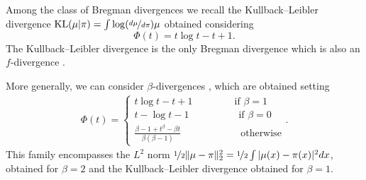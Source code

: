 \documentclass{article}
\newcommand{\KL}{\mathop{\mathrm{KL}}\nolimits}
\newcommand{\R}{\mathbb R}
\begin{document}
Among the class of Bregman divergences we recall the Kullback--Leibler divergence 
$\KL(\mu|\pi) =\int \log(\nicefrac{d\mu}{d\pi}) \mu$ obtained considering %
\begin{equation*}
    \Phi(t)= t \log t  -t +1.
\end{equation*}
The Kullback--Leibler divergence is the only Bregman divergence which is also an $f$-divergence \citep{amari2009alpha}.

More generally, %
we can consider $\beta$-divergences \citep{cichocki2010families}, which are obtained setting
\begin{align*}
    \Phi(t) =\begin{cases}
         t\log t- t+1\qquad\qquad\ \textrm{if } \beta=1\\
        t-\log t-1\qquad\qquad\quad \textrm{if } \beta=0\\
        \frac{\beta-1+t^\beta-\beta t}{\beta(\beta-1)}\qquad\qquad \qquad\textrm{otherwise}
    \end{cases}.
\end{align*}
This family encompasses the $L^2$ norm $\nicefrac{1}{2}\|\mu-\pi\|_2^2 = \nicefrac{1}{2}\int |\mu(x)-\pi(x)|^2dx$, obtained for $\beta = 2$ and the Kullback--Leibler divergence obtained for $\beta = 1$.


\end{document}
